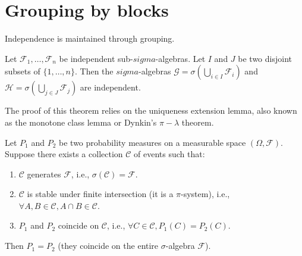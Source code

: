 \section{Grouping by blocks}%
Independence is maintained through grouping.%
\begin{theorem}
Let $\mathcal{F}_1, \ldots, \mathcal{F}_n$ be independent sub-$sigma$-algebras. Let $I$ and $J$ be two disjoint subsets of $\{1, \ldots, n\}$. Then the $sigma$-algebras $\mathcal{G} = \sigma(\bigcup_{i \in I} \mathcal{F}_i)$ and $\mathcal{H} = \sigma(\bigcup_{j \in J} \mathcal{F}_j)$ are independent.
\end{theorem}%
The proof of this theorem relies on the uniqueness extension lemma, also known as the monotone class lemma or Dynkin's $\pi-\lambda$ theorem.%
\begin{lemma}
Let $P_1$ and $P_2$ be two probability measures on a measurable space $(\Omega, \mathcal{F})$. Suppose there exists a collection $\mathcal{C}$ of events such that:
\begin{enumerate}
    \item[i)] $\mathcal{C}$ generates $\mathcal{F}$, i.e., $\sigma(\mathcal{C}) = \mathcal{F}$.
    \item[ii)] $\mathcal{C}$ is stable under finite intersection (it is a $\pi$-system), i.e., $\forall A, B \in \mathcal{C}, A \cap B \in \mathcal{C}$.
    \item[iii)] $P_1$ and $P_2$ coincide on $\mathcal{C}$, i.e., $\forall C \in \mathcal{C}, P_1(C) = P_2(C)$.
\end{enumerate}
Then $P_1 = P_2$ (they coincide on the entire $\sigma$-algebra $\mathcal{F}$).
\end{lemma}%

